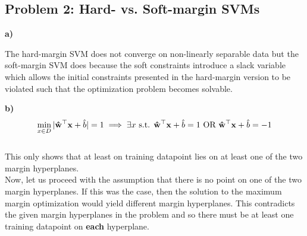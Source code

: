 \documentclass[a4paper]{article}
\begin{document}
 
\subsection*{Problem 2: Hard- vs. Soft-margin SVMs}
\textbf{a)} 

The hard-margin SVM does not converge on non-linearly separable data but the soft-margin SVM does because the soft constraints introduce a slack variable which allows the initial constraints presented in the hard-margin version to be violated such that the optimization problem becomes solvable. \\

\textbf{b)} 
\[
\min_{x \in D} |\mathbf{\hat w}^\top\mathbf{x} + \hat b| = 1 \\
\implies \exists x \text{ s.t. } \mathbf{\hat w}^\top\mathbf{x} + \hat b = 1 \text{ OR } \mathbf{\hat w}^\top\mathbf{x} + \hat b = -1
\] \\

This only shows that at least on training datapoint lies on at least one of the two margin hyperplanes. \\

Now, let us proceed with the assumption that there is no point on one of the two margin hyperplanes. If this was the case, then the solution to the maximum margin optimization would yield different margin hyperplanes. This contradicts the given margin hyperplanes in the problem and so there must be at least one training datapoint on \textbf{each} hyperplane. \\
\end{document}
